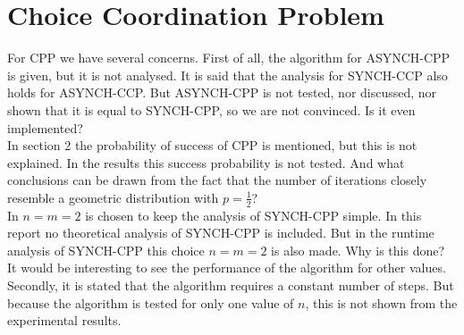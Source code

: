 \documentclass[nocopyrightspace]{acm_proc_article-sp}
\begin{document}
\section{Choice Coordination Problem}
For CPP we have several concerns. First of all, the algorithm for ASYNCH-CPP is given, but it is not analysed. It is said that the analysis for SYNCH-CCP also holds for ASYNCH-CCP. But ASYNCH-CPP is not tested, nor discussed, nor shown that it is equal to SYNCH-CPP, so we are not convinced. Is it even implemented? \\
In section 2 the probability of success of CPP is mentioned, but this is not explained. In the results this success probability is not tested. And what conclusions can be drawn from the fact that the number of iterations closely resemble a geometric distribution with $p=\frac{1}{2}$? \\
In \cite{motwani2010randomized} $n=m=2$ is chosen to keep the analysis of SYNCH-CPP simple. In this report no theoretical analysis of SYNCH-CPP is included. But in the runtime analysis of SYNCH-CPP this choice $n=m=2$ is also made. Why is this done? It would be interesting to see the performance of the algorithm for other values. Secondly, it is stated that the algorithm requires a constant number of steps. But because the algorithm is tested for only one value of $n$, this is not shown from the experimental results. 
\end{document}
